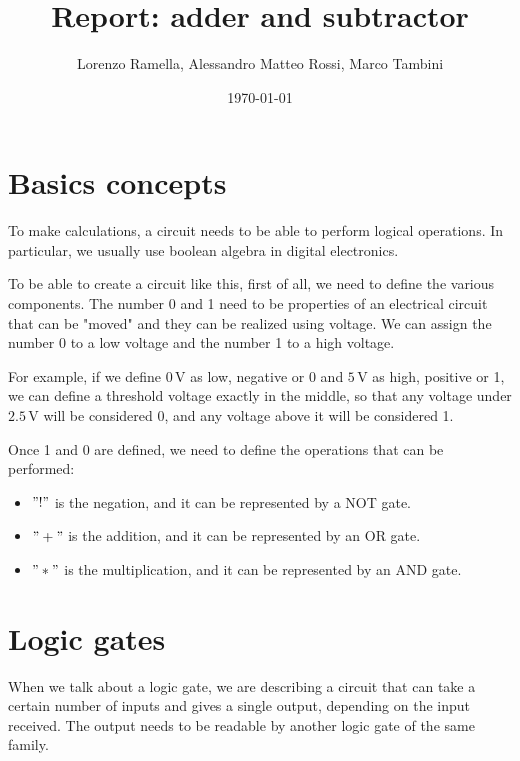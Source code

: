 \documentclass{article}
\title{Report: adder and subtractor}
\author{Lorenzo Ramella, Alessandro Matteo Rossi, Marco Tambini}
\date{\today}
\begin{document}
\maketitle

\tableofcontents

\clearpage

\section{Basics concepts}

To make calculations, a circuit needs to be able to perform logical operations. In particular, we usually use boolean algebra in digital electronics. 

\vspace{3mm}

To be able to create a circuit like this, first of all, we need to define the various components.
The number 0 and 1 need to be properties of an electrical circuit that can be "moved" and they can be realized using voltage. We can assign the number 0 to a low voltage and the number 1 to a high voltage. 

\vspace{3mm}

For example, if we define $0\,\textrm{V}$ as low, negative or 0 and $5\,\textrm{V}$ as high, positive or 1, we can define a threshold voltage exactly in the middle, so that any voltage under $2.5\,\textrm{V}$ will be considered 0, and any voltage above it will be considered 1.

\vspace{3mm}

Once 1 and 0 are defined, we need to define the operations that can be performed:

\begin{itemize}
\item $"!"$ is the negation, and it can be represented by a NOT gate.
\item $"+"$ is the addition, and it can be represented by an OR gate.
\item $"*"$ is the multiplication, and it can be represented by an AND gate.
\end{itemize}

\section{Logic gates}

When we talk about a logic gate, we are describing a circuit that can take a certain number of inputs and gives a single output, depending on the input received. The output needs to be readable by another logic gate of the same family.
\end{document}
